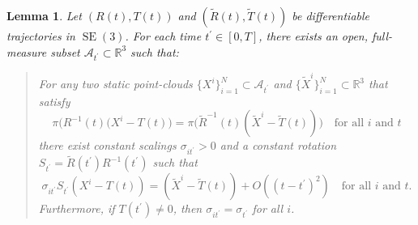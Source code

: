 \documentclass[]{article}
\newtheorem{lemma}{Lemma}
\def\Xw{\tilde{X}}
\def\Rw{\tilde{R}}
\def\Tw{\tilde{T}}
\def\1{^{\prime}}
\def\inv{^{-1}}
\def\RR{\mathbb{R}}
\def\subs{\subset}
\def\SE{\operatorname{SE}}
\def\Aa{\mathcal{A}}
\begin{document}
\begin{lemma}\label{claim-one}
Let $(R(t),T(t))$ and $(\Rw(t),\Tw(t))$ be differentiable trajectories in $\SE(3)$.
For each time $t\1\in[0,T]$, there exists an open, full-measure subset $\Aa_{t\1}\subs\RR^3$
such that:
\begin{quote}
For any two static point-clouds $\{X^i\}_{i=1}^N\subs\Aa_{t\1}$ and $\{\Xw^i\}_{i=1}^N\subs\RR^3$ that satisfy
\begin{equation}
\pi\bigl(R\inv(t) (X^i-T(t)\bigr) = \pi\bigl(\Rw\inv(t) (\Xw^i-\Tw(t))\bigr) 
\quad\text{for all $i$ and $t$}
\label{prob}
\end{equation}
there exist constant scalings $\sigma_{it\1}>0$ and a constant rotation $S_{t\1}=\Rw({t\1})R\inv({t\1})$ such that
$$ \sigma_{it\1} S_{t\1} (X^i - T(t)) = (\Xw^i-\Tw(t)) + O((t-t\1)^2)
\quad\text{for all $i$ and $t$}.$$
Furthermore, if $T(t\1)\neq0$, then $\sigma_{it\1}=\sigma_{t\1}$ for all $i$.
\end{quote}
\end{lemma}
\end{document}
